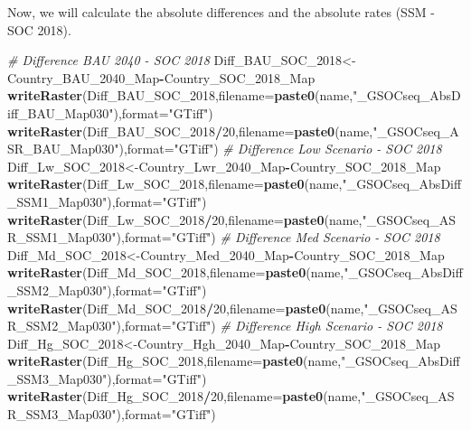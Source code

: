 \documentclass[
  10pt,
  b5paper,
]{book}
\newenvironment{Shaded}{\begin{snugshade}}{\end{snugshade}}
\newcommand{\CommentTok}[1]{\textcolor[rgb]{0.56,0.35,0.01}{\textit{#1}}}
\newcommand{\DataTypeTok}[1]{\textcolor[rgb]{0.13,0.29,0.53}{#1}}
\newcommand{\DecValTok}[1]{\textcolor[rgb]{0.00,0.00,0.81}{#1}}
\newcommand{\KeywordTok}[1]{\textcolor[rgb]{0.13,0.29,0.53}{\textbf{#1}}}
\newcommand{\NormalTok}[1]{#1}
\newcommand{\OperatorTok}[1]{\textcolor[rgb]{0.81,0.36,0.00}{\textbf{#1}}}
\newcommand{\StringTok}[1]{\textcolor[rgb]{0.31,0.60,0.02}{#1}}
\begin{document}
Now, we will calculate the absolute differences and the absolute rates (SSM - SOC 2018).

\begin{Shaded}
\begin{Highlighting}[]
\CommentTok{# Difference BAU 2040 - SOC 2018}
\NormalTok{Diff_BAU_SOC_}\DecValTok{2018}\NormalTok{<-Country_BAU_}\DecValTok{2040}\NormalTok{_Map}\OperatorTok{-}\NormalTok{Country_SOC_}\DecValTok{2018}\NormalTok{_Map}
\KeywordTok{writeRaster}\NormalTok{(Diff_BAU_SOC_}\DecValTok{2018}\NormalTok{,}\DataTypeTok{filename=}\KeywordTok{paste0}\NormalTok{(name,}\StringTok{"_GSOCseq_AbsDiff_BAU_Map030"}\NormalTok{),}\DataTypeTok{format=}\StringTok{"GTiff"}\NormalTok{)}
\KeywordTok{writeRaster}\NormalTok{(Diff_BAU_SOC_}\DecValTok{2018}\OperatorTok{/}\DecValTok{20}\NormalTok{,}\DataTypeTok{filename=}\KeywordTok{paste0}\NormalTok{(name,}\StringTok{"_GSOCseq_ASR_BAU_Map030"}\NormalTok{),}\DataTypeTok{format=}\StringTok{"GTiff"}\NormalTok{)}
\CommentTok{# Difference Low Scenario - SOC 2018}
\NormalTok{Diff_Lw_SOC_}\DecValTok{2018}\NormalTok{<-Country_Lwr_}\DecValTok{2040}\NormalTok{_Map}\OperatorTok{-}\NormalTok{Country_SOC_}\DecValTok{2018}\NormalTok{_Map}
\KeywordTok{writeRaster}\NormalTok{(Diff_Lw_SOC_}\DecValTok{2018}\NormalTok{,}\DataTypeTok{filename=}\KeywordTok{paste0}\NormalTok{(name,}\StringTok{"_GSOCseq_AbsDiff_SSM1_Map030"}\NormalTok{),}\DataTypeTok{format=}\StringTok{"GTiff"}\NormalTok{)}
\KeywordTok{writeRaster}\NormalTok{(Diff_Lw_SOC_}\DecValTok{2018}\OperatorTok{/}\DecValTok{20}\NormalTok{,}\DataTypeTok{filename=}\KeywordTok{paste0}\NormalTok{(name,}\StringTok{"_GSOCseq_ASR_SSM1_Map030"}\NormalTok{),}\DataTypeTok{format=}\StringTok{"GTiff"}\NormalTok{)}
\CommentTok{# Difference Med Scenario - SOC 2018}
\NormalTok{Diff_Md_SOC_}\DecValTok{2018}\NormalTok{<-Country_Med_}\DecValTok{2040}\NormalTok{_Map}\OperatorTok{-}\NormalTok{Country_SOC_}\DecValTok{2018}\NormalTok{_Map}
\KeywordTok{writeRaster}\NormalTok{(Diff_Md_SOC_}\DecValTok{2018}\NormalTok{,}\DataTypeTok{filename=}\KeywordTok{paste0}\NormalTok{(name,}\StringTok{"_GSOCseq_AbsDiff_SSM2_Map030"}\NormalTok{),}\DataTypeTok{format=}\StringTok{"GTiff"}\NormalTok{)}
\KeywordTok{writeRaster}\NormalTok{(Diff_Md_SOC_}\DecValTok{2018}\OperatorTok{/}\DecValTok{20}\NormalTok{,}\DataTypeTok{filename=}\KeywordTok{paste0}\NormalTok{(name,}\StringTok{"_GSOCseq_ASR_SSM2_Map030"}\NormalTok{),}\DataTypeTok{format=}\StringTok{"GTiff"}\NormalTok{)}
\CommentTok{# Difference High Scenario - SOC 2018}
\NormalTok{Diff_Hg_SOC_}\DecValTok{2018}\NormalTok{<-Country_Hgh_}\DecValTok{2040}\NormalTok{_Map}\OperatorTok{-}\NormalTok{Country_SOC_}\DecValTok{2018}\NormalTok{_Map}
\KeywordTok{writeRaster}\NormalTok{(Diff_Hg_SOC_}\DecValTok{2018}\NormalTok{,}\DataTypeTok{filename=}\KeywordTok{paste0}\NormalTok{(name,}\StringTok{"_GSOCseq_AbsDiff_SSM3_Map030"}\NormalTok{),}\DataTypeTok{format=}\StringTok{"GTiff"}\NormalTok{)}
\KeywordTok{writeRaster}\NormalTok{(Diff_Hg_SOC_}\DecValTok{2018}\OperatorTok{/}\DecValTok{20}\NormalTok{,}\DataTypeTok{filename=}\KeywordTok{paste0}\NormalTok{(name,}\StringTok{"_GSOCseq_ASR_SSM3_Map030"}\NormalTok{),}\DataTypeTok{format=}\StringTok{"GTiff"}\NormalTok{)}
\end{Highlighting}
\end{Shaded}
\end{document}
